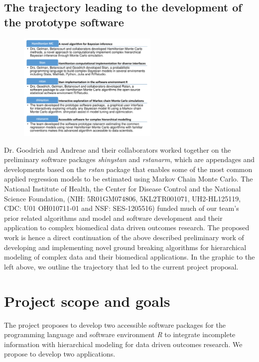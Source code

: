 \documentclass[11pt,notitlepage]{article}
\begin{document}
\subsection*{The trajectory leading to the development of the prototype software} 

\begin{figure} %
    \centering
\includegraphics[width=0.6\textwidth]{Figures/SoftwareTrajectory.pdf}
\end{figure}

Dr. Goodrich and Andreae and their collaborators worked together on the preliminary software packages \textit{shinystan} and \textit{rstanarm}, which are appendages and developments based on the \textit{rstan} package that enables some of the most common applied regression models to be estimated using Markov Chain Monte Carlo. The National Institute of Health, the Center for Disease Control and the National Science Foundation, (NIH: 5R01GM074806, 5KL2TR001071, UH2-HL125119,  CDC: U01 OH010711-01 and NSF: SES-1205516) funded much of our team's prior related algorithms and model and software development and their application to complex biomedical data driven outcomes research. The proposed work is hence a direct continuation of the above described preliminary work of developing and implementing novel ground breaking algorithms for hierarchical modeling of complex data and their biomedical applications. In the graphic to the left above, we outline the trajectory that led to the current project proposal.


\section*{Project scope and goals }

The project proposes to develop two accessible software packages for the programming language and software environment \textit{R} to integrate incomplete information with hierarchical modeling for data driven outcomes research. We propose to develop two applications.
\end{document}
